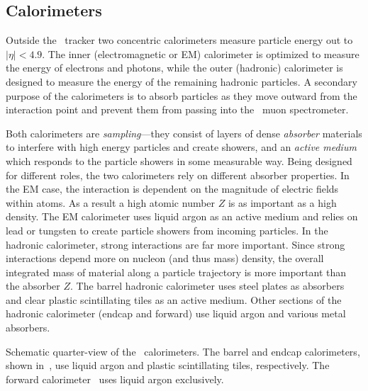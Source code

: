 


\subsection{Calorimeters}
\label{sec:atlas-calo}
Outside the \atlas\ tracker two concentric calorimeters measure particle energy out to $|\eta| < 4.9$.
The inner (electromagnetic or EM) calorimeter is optimized to measure the energy of electrons and photons, while the outer (hadronic) calorimeter is designed to measure the energy of the remaining hadronic particles.
A secondary purpose of the calorimeters is to absorb particles as they move outward from the interaction point and prevent them from passing into the \atlas\ muon spectrometer.

Both calorimeters are \emph{sampling}---they consist of layers of dense \emph{absorber} materials to interfere with high energy particles and create showers, and an \emph{active medium} which responds to the particle showers in some measurable way.
Being designed for different roles, the two calorimeters rely on different absorber properties.
In the EM case, the interaction is dependent on the magnitude of electric fields within atoms.
As a result a high atomic number $Z$ is as important as a high density.
The EM calorimeter uses liquid argon as an active medium and relies on lead or tungsten to create particle showers from incoming particles.
In the hadronic calorimeter, strong interactions are far more important.
Since strong interactions depend more on nucleon (and thus mass) density, the overall integrated mass of material along a particle trajectory is more important than the absorber $Z$.
The barrel hadronic calorimeter uses steel plates as absorbers and clear plastic scintillating tiles as an active medium.
Other sections of the hadronic calorimeter (endcap and forward) use liquid argon and various metal absorbers.

\begin{cfig}
  \caption[Atlas calorimeter quarter-view]{Schematic quarter-view of the \atlas\ calorimeters. The barrel and endcap calorimeters, shown in~, use liquid argon and plastic scintillating tiles, respectively. The forward calorimeter~ uses liquid argon exclusively.}
  \label{fig:atlas-calos-quarter}
\end{cfig}


